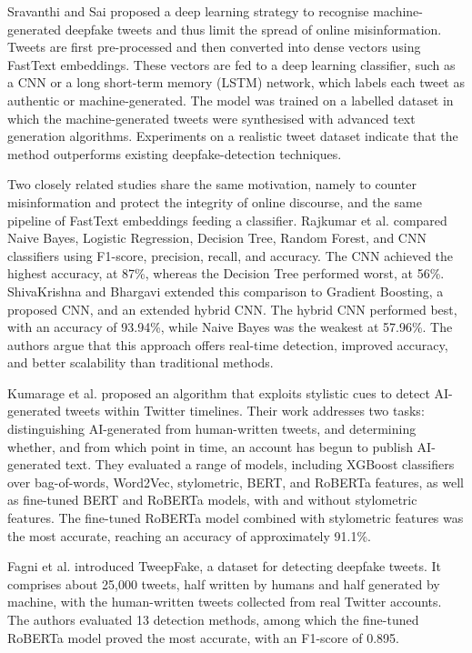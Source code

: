 Sravanthi and Sai \cite{sravanthi2025} proposed a deep learning strategy to recognise machine-generated deepfake tweets and thus limit the spread of online misinformation. Tweets are first pre-processed and then converted into dense vectors using FastText embeddings. These vectors are fed to a deep learning classifier, such as a CNN or a long short-term memory (LSTM) network, which labels each tweet as authentic or machine-generated. The model was trained on a labelled dataset in which the machine-generated tweets were synthesised with advanced text generation algorithms. Experiments on a realistic tweet dataset indicate that the method outperforms existing deepfake-detection techniques.

Two closely related studies share the same motivation, namely to counter misinformation and protect the integrity of online discourse, and the same pipeline of FastText embeddings feeding a classifier. Rajkumar et al. \cite{rajkumar2024} compared Naive Bayes, Logistic Regression, Decision Tree, Random Forest, and CNN classifiers using F1-score, precision, recall, and accuracy. The CNN achieved the highest accuracy, at 87\%, whereas the Decision Tree performed worst, at 56\%. ShivaKrishna and Bhargavi \cite{shivakrishna2025} extended this comparison to Gradient Boosting, a proposed CNN, and an extended hybrid CNN. The hybrid CNN performed best, with an accuracy of 93.94\%, while Naive Bayes was the weakest at 57.96\%. The authors argue that this approach offers real-time detection, improved accuracy, and better scalability than traditional methods.

Kumarage et al. \cite{kumarage2023} proposed an algorithm that exploits stylistic cues to detect AI-generated tweets within Twitter timelines. Their work addresses two tasks: distinguishing AI-generated from human-written tweets, and determining whether, and from which point in time, an account has begun to publish AI-generated text. They evaluated a range of models, including XGBoost classifiers over bag-of-words, Word2Vec, stylometric, BERT, and RoBERTa features, as well as fine-tuned BERT and RoBERTa models, with and without stylometric features. The fine-tuned RoBERTa model combined with stylometric features was the most accurate, reaching an accuracy of approximately 91.1\%.

Fagni et al. \cite{fagni2021} introduced TweepFake, a dataset for detecting deepfake tweets. It comprises about 25{,}000 tweets, half written by humans and half generated by machine, with the human-written tweets collected from real Twitter accounts. The authors evaluated 13 detection methods, among which the fine-tuned RoBERTa model proved the most accurate, with an F1-score of 0.895.

